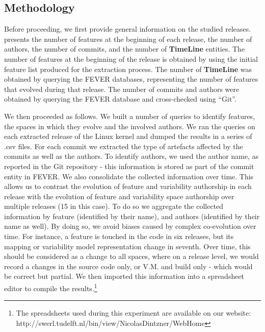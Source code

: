 \subsection{Methodology}

Before proceeding, we first provide general information on the studied releases.
 presents the number of features at the beginning of each release,
the number of authors, the number of commits, and the number of \textbf{TimeLine} entities.
The number of features at the beginning of the release is obtained 
by using the initial feature list produced for the extraction process.
The number of \textbf{TimeLine} was obtained by querying the FEVER databases, representing the number of features that evolved during that release.
The number of commits and authors were obtained by querying the FEVER database
and cross-checked using ``Git''.

We then proceeded as follows.
We built a number of queries to identify features, the spaces in which they evolve and the involved authors.
We ran the queries on each extracted release of the Linux kernel and dumped the results in a series of .csv files.
For each commit we extracted the type of artefacts affected by the commits as well as the authors.
To identify authors, we used the author name, as reported in the Git repository - this information is stored as part of the 
commit entity in FEVER.
We also consolidate the collected information over time. This allows us to contrast the evolution of feature and variability authorship in each release with the evolution of feature and variability space authorship over multiple releases (15 in this case).
To do so we aggregate the collected information by feature (identified by their name), and authors (identified by their name as well).
By doing so, we avoid biases caused by complex co-evolution over time. For instance, a feature is touched in the code in six releases, but its mapping or variability model representation change in seventh. Over time, this should be considered as a change to all spaces, where on a release level, we would record a changes in the source code only, or V.M. and build only - which would be correct but partial.
We then imported this information into a spreadsheet editor to compile the results.\footnote{The spreadsheets used during this experiment are available on our website: http://swerl.tudelft.nl/bin/view/NicolasDintzner/WebHome}

